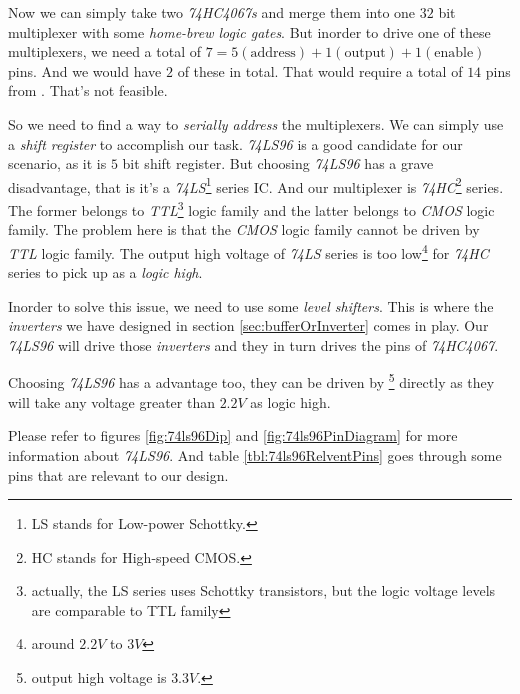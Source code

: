 \documentclass[../../main]{subfiles}
\begin{document}
Now we can simply take two \emph{74HC4067s} and merge them into one $32$ bit multiplexer with
some \emph{home-brew logic gates}. But inorder to drive one of these multiplexers, we need
a total of $7 = 5 (\mbox{address}) + 1 (\mbox{output}) + 1 (\mbox{enable})$ pins. And we would
have $2$ of these in total. That would require a total of $14$ pins from \esp. That's not
feasible.

So we need to find a way to \emph{serially address} the multiplexers. We can simply use a
\emph{shift register} to accomplish our task. \emph{74LS96} is a good candidate for our
scenario, as it is $5$ bit shift register. But choosing \emph{74LS96} has a grave disadvantage,
that is it's a \emph{74LS}\footnote{LS stands for Low-power Schottky.} series IC.
And our multiplexer is \emph{74HC}\footnote{HC stands for High-speed CMOS.} series. The former
belongs to \emph{TTL}\footnote{actually, the LS series uses Schottky transistors, but the
logic voltage levels are comparable to TTL family} logic family and the latter belongs to
\emph{CMOS} logic family. The problem here is that the \emph{CMOS} logic family cannot be driven
by \emph{TTL} logic family. The output high voltage of \emph{74LS} series is too low\footnote{around
$2.2\si{V}$ to $3\si{V}$} for \emph{74HC} series to pick up as a \emph{logic high}.

Inorder to solve this issue, we need to use some \emph{level shifters}. This is where the
\emph{inverters} we have designed in section \ref{sec:bufferOrInverter} comes in play.
Our \emph{74LS96} will drive those \emph{inverters} and they in turn drives the pins of
\emph{74HC4067}.

Choosing \emph{74LS96} has a advantage too, they can be driven by \esp\footnote{output high voltage is
$3.3\si{V}$.} directly as they will take any voltage greater than $2.2\si{V}$ as logic high.

Please refer to figures \ref{fig:74ls96Dip} and \ref{fig:74ls96PinDiagram} for more information about
\emph{74LS96}. And table \ref{tbl:74ls96RelventPins} goes through some pins that are relevant to
our design.


\end{document}
